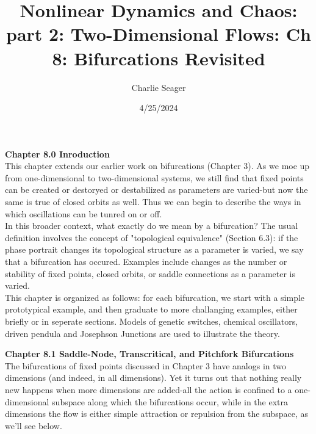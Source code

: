 \documentclass{article}
\newcommand\tab[1][1cm]{\hspace*{#1}}
\begin{document}
\title {Nonlinear Dynamics and Chaos: part 2: Two-Dimensional Flows: Ch 8: Bifurcations Revisited} 

\author{Charlie Seager}

\date{4/25/2024}

\maketitle

\textbf {Chapter 8.0 Inroduction} \\
This chapter extends our earlier work on bifurcations (Chapter 3). As we moe up from one-dimensional to two-dimensional systems, we still find that fixed points can be created or destoryed or destabilized as parameters are varied-but now the same is true of closed orbits as well. Thus we can begin to describe the ways in which oscillations can be tunred on or off. \\ \tab
In this broader context, what exactly do we mean by a bifurcation? The usual definition involves the concept of "topological equivalence" (Section 6.3): if the phase portrait changes its topological structure as a parameter is varied, we say that a bifurcation has occured. Examples include changes as the number or stability of fixed points, closed orbits, or saddle connections as a parameter is varied. \\ \tab
This chapter is organized as follows: for each bifurcation, we start with a simple prototypical example, and then graduate to more challanging examples, either briefly or in seperate sections. Models of genetic switches, chemical oscillators, driven pendula and Josephson Junctions are used to illustrate the theory. 

\textbf {Chapter 8.1 Saddle-Node, Transcritical, and Pitchfork Bifurcations} \\ 
The bifurcations of fixed points discussed in Chapter 3 have analogs in two dimensions (and indeed, in all dimensions). Yet it turns out that nothing really new happens when more dimensions are added-all the action is confined to a one-dimensional subspace along which the bifurcations occur, while in the extra dimensions the flow is either simple attraction or repulsion from the subspace, as we'll see below.
\end{document}
